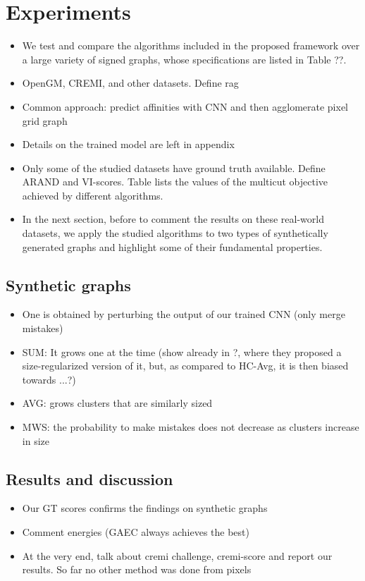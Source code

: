 
\section{Experiments}\label{sec:neuro_segm_exp}
\begin{itemize}
\item We test and compare the algorithms included in the proposed \algname{} framework over a large variety of signed graphs, whose specifications are listed in Table ??.
\item OpenGM, CREMI, and other datasets. Define rag
\item Common approach: predict affinities with CNN and then agglomerate pixel grid graph
\item Details on the trained model are left in appendix
\item Only some of the studied datasets have ground truth available. Define ARAND and VI-scores. 
Table lists the values of the multicut objective achieved by different algorithms.
\item In the next section, before to comment the results on these real-world datasets, we apply the studied algorithms to two types of synthetically generated graphs and highlight some of their fundamental properties.
\end{itemize}

\subsection{Synthetic graphs}
\begin{itemize}
\item  One is obtained by perturbing the output of our trained CNN (only merge mistakes)

\item SUM: It grows one at the time (show already in ?, where they proposed a size-regularized version of it, but, as compared to HC-Avg, it is then biased towards ...?)
\item AVG: grows clusters that are similarly sized
\item MWS: the probability to make mistakes does not decrease as clusters increase in size
\end{itemize}

\subsection{Results and discussion}
\begin{itemize}
\item Our GT scores confirms the findings on synthetic graphs
\item Comment energies (GAEC always achieves the best)
\item At the very end, talk about cremi challenge, cremi-score and report our results. So far no other method was done from pixels
\end{itemize}

